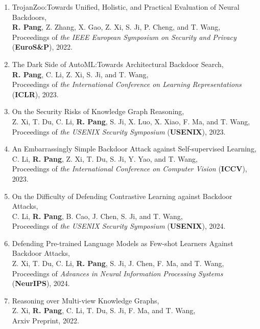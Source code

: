 \documentclass[letterpaper,11pt]{article}
\begin{document}
\begin{enumerate}[labelsep=15pt, parsep=-4pt]
    \item TrojanZoo:\@ Towards Unified, Holistic, and Practical Evaluation of Neural Backdoors,\\
    \textbf{R. Pang}, Z. Zhang, X. Gao, Z. Xi, S. Ji, P. Cheng, and T. Wang,\\
    Proceedings of {\it the IEEE European Symposium on Security and Privacy\/} (\textbf{EuroS\&P}), 2022.
    
    \item The Dark Side of AutoML:\@ Towards Architectural Backdoor Search,\\
    \textbf{R. Pang}, C. Li, Z. Xi, S. Ji, and T. Wang,\\
    Proceedings of {\it the International Conference on Learning Representations\/} (\textbf{ICLR}), 2023.
    
    \item On the Security Risks of Knowledge Graph Reasoning,\\
    Z. Xi, T. Du, C. Li, \textbf{R. Pang}, S. Ji, X. Luo, X. Xiao, F. Ma, and T. Wang,\\
    Proceedings of {\it the USENIX Security Symposium\/} (\textbf{USENIX}), 2023.
    
    \item An Embarrassingly Simple Backdoor Attack against Self-supervised Learning,\\
    C. Li, \textbf{R. Pang}, Z. Xi, T. Du, S. Ji, Y. Yao, and T. Wang,\\
    Proceedings of {\it the International Conference on Computer Vision\/} (\textbf{ICCV}), 2023.

    \item On the Difficulty of Defending Contrastive Learning against Backdoor Attacks,\\
    C. Li, \textbf{R. Pang}, B. Cao, J. Chen, S. Ji, and T. Wang,\\
    Proceedings of {\it the USENIX Security Symposium\/} (\textbf{USENIX}), 2024.

    \item Defending Pre-trained Language Models as Few-shot Learners Against Backdoor Attacks,\\
    Z. Xi, T. Du, C. Li, \textbf{R. Pang}, S. Ji, J. Chen, F. Ma, and T. Wang,\\
    Proceedings of {\it Advances in Neural Information Processing Systems\/} (\textbf{NeurIPS}), 2024.

    \item Reasoning over Multi-view Knowledge Graphs,\\
    Z. Xi, \textbf{R. Pang}, C. Li, T. Du, S. Ji, F. Ma, and T. Wang,\\
    Arxiv Preprint, 2022.

    \end{enumerate}
\end{document}
